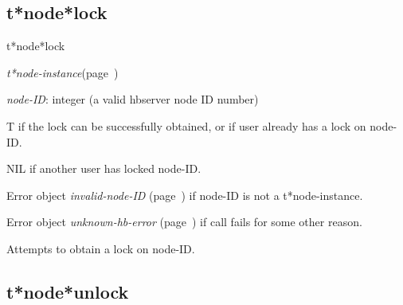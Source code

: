 \subsection{t*node*lock}
\label{t*node*lock}

\begin{description}
\item [Name:]  t*node*lock

\item [Class:] {\sl t*node-instance}\hfill(page~\pageref{t*node-instance})

\item [Parameters:]
\item {\sl node-ID}:  
integer (a valid hbserver node ID number)


\item [Return-value:]
T if the lock can be successfully obtained, or if
user already has a lock on node-ID.

NIL if another user has locked node-ID.

Error object {\sl invalid-node-ID} (page~\pageref{invalid-node-ID}) if node-ID is
not a t*node-instance.

Error object {\sl unknown-hb-error} (page~\pageref{unknown-hb-error}) if call fails
for some other reason.

\item [Description:]

Attempts to obtain a lock on node-ID. 

\item [Public:]



\end{description}
\horizontalline

\subsection{t*node*unlock}
\label{t*node*unlock}


